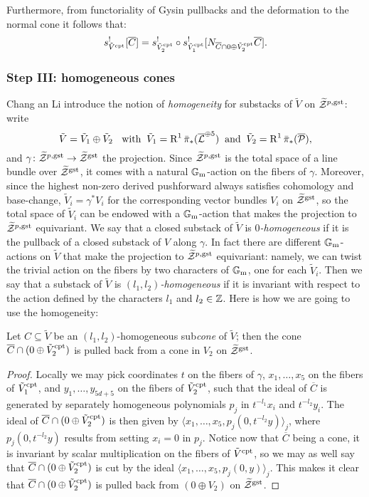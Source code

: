  Furthermore, from functoriality of Gysin pullbacks and the deformation to the normal cone it follows that:
 \[s^!_{\tilde V^{\rm{cpt}}}[\overline C]=s^!_{\tilde V_2^{\rm{cpt}}}\circ s^!_{\tilde V_1^{\rm{cpt}}}[N_{\overline C\cap 0\oplus\tilde V_2^{\rm{cpt}}}\overline C].\]
 
 \subsubsection{Step III: homogeneous cones}
Chang an Li introduce the notion of \emph{homogeneity} for substacks of $\tilde V$ on $\widetilde{\mathcal Z}^{p,\rm{gst}}$: write 
\[\tilde V=\tilde V_1\oplus\tilde V_2\;\;\text{ with} \;\;\tilde V_1=\operatorname{R}^1\bar{\pi}_*(\overline{\mathcal{L}}^{\oplus 5})\;\; \text{and}\;\; \tilde V_2=\operatorname{R}^1\bar{\pi}_*(\overline{\mathcal P}),\]
 and $\gamma\colon \widetilde{\mathcal Z}^{p,\rm{gst}}\rightarrow\widetilde{\mathcal Z}^{\rm{gst}}$ the projection. Since $\widetilde{\mathcal Z}^{p,\rm{gst}}$ is the total space of a line bundle over $\widetilde{\mathcal Z}^{\rm{gst}}$, it comes with a natural $\mathbb{G}_{\text{m}}$-action on the fibers of $\gamma$. Moreover, since the highest non-zero derived pushforward always satisfies cohomology and base-change, $\tilde V_i=\gamma^*V_i$ for the corresponding vector bundles $V_i$ on $\widetilde{\mathcal Z}^{\rm{gst}}$, so the total space of $\tilde V_i$ can be endowed with a $\mathbb{G}_{\text{m}}$-action that makes the projection to $\widetilde{\mathcal Z}^{p,\rm{gst}}$ equivariant. We say that a closed substack of $\tilde V$ is $0$\emph{-homogeneous} if it is the pullback of a closed substack of $V$ along $\gamma$. In fact there are different $\mathbb{G}_{\text{m}}$-actions on $\tilde V$ that make the projection to $\widetilde{\mathcal Z}^{p,\rm{gst}}$ equivariant: namely, we can twist the trivial action on the fibers by two characters of $\mathbb{G}_{\text{m}}$, one for each $\tilde V_i$. Then we say that a substack of $\tilde V$ is $(l_1,l_2)$\emph{-homogeneous} if it is invariant with respect to the action defined by the characters $l_1$ and $l_2\in\mathbb{Z}$. Here is how we are going to use the homogeneity:

\begin{lem}
 Let $C\subseteq \tilde V$ be an $(l_1,l_2)$-homogeneous sub\emph{cone} of $\tilde V$; then the cone $\overline{C}\cap(0\oplus\tilde V_2^{\rm{cpt}})$ is pulled back from a cone in $V_2$ on $\widetilde{\mathcal Z}^{\rm{gst}}$.
\end{lem}
\begin{proof}
 Locally we may pick coordinates $t$ on the fibers of $\gamma$, $x_1,\ldots,x_5$ on the fibers of $\tilde V_1^{\rm{cpt}}$, and $y_1,\ldots,y_{5d+5}$ on the fibers of $\tilde V_2^{\rm{cpt}}$, such that the ideal of $\overline{C}$ is generated by separately homogeneous polynomials $p_j$ in $t^{-l_1}x_i$ and $t^{-l_2}y_i$. The ideal of $\overline{C}\cap(0\oplus\tilde V_2^{\rm{cpt}})$ is then given by $\langle x_1,\ldots, x_5,p_j(0,t^{-l_2}y)\rangle_j$, where $p_j(0,t^{-l_2}y)$ results from setting $x_i=0$ in $p_j$. Notice now that $\overline{C}$ being a cone, it is invariant by scalar multiplication on the fibers of $\tilde V^{\rm{cpt}}$, so we may as well say that $\overline{C}\cap(0\oplus\tilde V_2^{\rm{cpt}})$ is cut by the ideal $\langle x_1,\ldots, x_5,p_j(0,y)\rangle_j$. This makes it clear that $\overline{C}\cap(0\oplus\tilde V_2^{\rm{cpt}})$ is pulled back from $(0\oplus V_2)$ on $\widetilde{\mathcal Z}^{\rm{gst}}$.
\end{proof}

